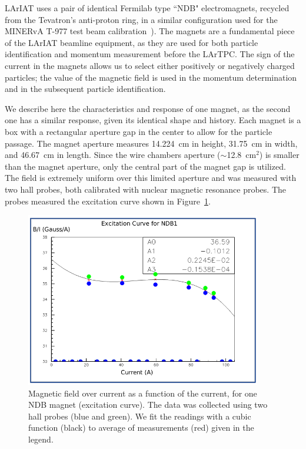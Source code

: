 LArIAT uses a pair of identical Fermilab type ``NDB" electromagnets, recycled from the Tevatron's anti-proton ring, in a similar configuration used for the  MINERvA T-977 test beam calibration~\cite{MinervaTestbeam}). 
The magnets are a fundamental piece of the LArIAT beamline equipment, as they are used for both particle identification and momentum measurement before the LArTPC. The sign of the current in the magnets allows us to select either positively or negatively charged particles; the value of the magnetic field is used in the momentum determination and in the subsequent particle identification. 

We describe here the characteristics and response of one magnet, as the second one has a similar response, given its identical shape and history. Each magnet is a box with a rectangular aperture gap in the center to allow for the particle passage.  The magnet aperture measures 14.224~cm in height, 31.75~cm in width, and  46.67~cm in length.  Since the wire chambers aperture ($\sim$12.8~cm$^2$) is smaller than the magnet aperture, only the central part of the magnet gap is utilized. The field is extremely uniform over this limited aperture and was measured with two hall probes, both calibrated with nuclear magnetic resonance probes. The probes measured the excitation curve shown in Figure~\ref{fig:magnet_excitation}. 

\begin{figure}[!h]
\begin{centering}
\vspace{-0.3cm}
\includegraphics[height=3.0in]{Chapter-3/Images/ExcitationCurves.png}
\caption{
{ Magnetic field over current as a function of the current, for one NDB magnet (excitation curve). The data was collected using two hall probes (blue and green). We fit the readings with a cubic function (black) to average of measurements (red) given in the legend.}
}
\label{fig:magnet_excitation}
\end{centering}
\end{figure}

